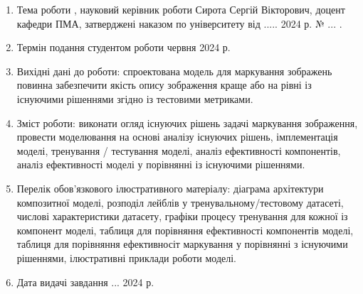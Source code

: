 \documentclass{udstu}
\begin{document}

\begin{enumerate}[1.]
	\item Тема роботи ,
	науковий керівник роботи Сирота Сергій Вікторович, доцент кафедри ПМА, затверджені наказом по університету
	від  ..... 2024 р. № ... .

	\item Термін подання студентом роботи  червня 2024 р.

	\item Вихідні дані до роботи: спроектована модель для маркування зображень повинна
	забезпечити якість опису зображення краще або на рівні із існуючими рішеннями згідно із
	тестовими метриками.

	\item Зміст роботи: виконати огляд існуючих рішень задачі маркування зображення,
	провести моделювання на основі аналізу існуючих рішень, імплементація моделі,
	тренування / тестування моделі, аналіз ефективності компонентів,
	аналіз ефективності моделі у порівнянні із існуючими рішеннями.

	\item Перелік обов'язкового ілюстративного матеріалу: діаграма архітектури композитної моделі,
	розподіл лейблів у тренувальному/тестовому датасеті, числові характеристики датасету,
	графіки процесу тренування для кожної із компонент моделі,
	таблиця для порівняння ефективності компонентів моделі,
	таблиця для порівняння ефективносіт маркування у порівнянні з існуючими рішеннями,
	ілюстративні приклади роботи моделі.

	\item Дата видачі завдання  ... 2024 р.
\end{enumerate}
\end{document}
